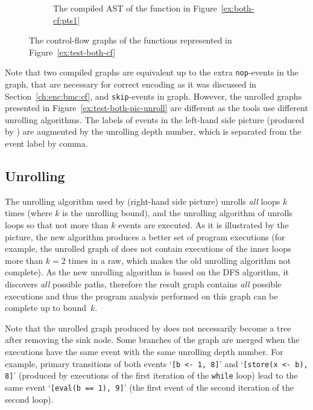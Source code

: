 \begin{figure}[!h]
\begin{subfigure}[b]{.49\textwidth}
  \caption{The compiled AST of the function in Figure~\ref{ex:both-cf:pts1}}
  \label{ex:both-cf:graph:pts1}
\end{subfigure}
%
\caption{The control-flow graphs of the functions represented in Figure~\ref{ex:test-both-cf}}
\label{ex:test-both-pic}
\end{figure}

Note that two compiled graphs are equivalent up to the extra \texttt{nop}-events in the \porthos[2] graph, that are necessary for correct encoding as it was discussed in Section~\ref{ch:enc:bmc:cf}, and \texttt{skip}-events in \porthos[1] graph.
However, the unrolled graphs presented in Figure~\ref{ex:test-both-pic-unroll} are different as the tools use different unrolling algorithms.
The labels of events in the left-hand side picture (produced by \porthos[2]) are augmented by the unrolling depth number, which is separated from the event label by comma.


\subsection{Unrolling}
\label{ch:eval:show:unrol}

The unrolling algorithm used by \porthos[1] (right-hand side picture) unrolls \textit{all} loops $k$ times (where $k$ is the unrolling bound), and the unrolling algorithm of \porthos[2] unrolls loops so that not more than $k$ events are executed.
As it is illustrated by the picture, the new algorithm produces a better set of program executions (for example, the unrolled graph of \porthos[1] does not contain executions of the inner loops more than $k=2$ times in a raw, which makes the old unrolling algorithm not complete).
As the new unrolling algorithm is based on the DFS algorithm, it discovers \textit{all} possible paths, therefore the result graph contains \textit{all} possible executions and thus the program analysis performed on this graph can be complete up to bound~$k$.

Note that the unrolled graph produced by \porthos[2] does not necessarily become a tree after removing the sink node.
Some branches of the graph are merged when the executions have the same event with the same unrolling depth number.
For example, primary transitions of both events `\lstinline{[b <- 1, 8]}' and `\lstinline{[store(x <- b), 8]}' (produced by executions of the first iteration of the \texttt{while} loop) lead to the same event `\lstinline{[eval(b == 1), 9]}' (the first event of the second iteration of the second loop).


